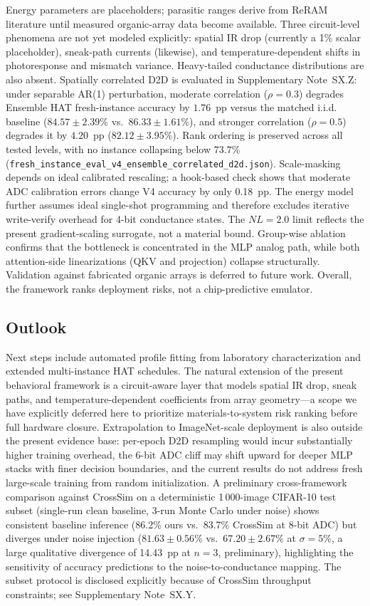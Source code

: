 Energy parameters are placeholders; parasitic ranges derive from ReRAM literature \citep{fastirdrop2025,iconniv2025} until measured organic-array data become available. Three circuit-level phenomena are not yet modeled explicitly: spatial IR drop (currently a 1\% scalar placeholder), sneak-path currents (likewise), and temperature-dependent shifts in photoresponse and mismatch variance. Heavy-tailed conductance distributions are also absent. Spatially correlated D2D is evaluated in Supplementary Note~SX.Z: under separable AR(1) perturbation, moderate correlation ($\rho=0.3$) degrades Ensemble HAT fresh-instance accuracy by $1.76$~pp versus the matched i.i.d. baseline ($84.57\pm2.39$\% vs.\ $86.33\pm1.61$\%), and stronger correlation ($\rho=0.5$) degrades it by $4.20$~pp ($82.12\pm3.95$\%). Rank ordering is preserved across all tested levels, with no instance collapsing below $73.7$\% (\texttt{fresh\_instance\_eval\_v4\_ensemble\_correlated\_d2d.json}). Scale-masking depends on ideal calibrated rescaling; a hook-based check shows that moderate ADC calibration errors change V4 accuracy by only 0.18~pp. The energy model further assumes ideal single-shot programming and therefore excludes iterative write-verify overhead for 4-bit conductance states. The $NL=2.0$ limit reflects the present gradient-scaling surrogate, not a material bound. Group-wise ablation confirms that the bottleneck is concentrated in the MLP analog path, while both attention-side linearizations (QKV and projection) collapse structurally. Validation against fabricated organic arrays is deferred to future work. Overall, the framework ranks deployment risks, not a chip-predictive emulator.

\subsection{Outlook}

Next steps include automated profile fitting from laboratory characterization and extended multi-instance HAT schedules. The natural extension of the present behavioral framework is a circuit-aware layer that models spatial IR drop, sneak paths, and temperature-dependent coefficients from array geometry---a scope we have explicitly deferred here to prioritize materials-to-system risk ranking before full hardware closure. Extrapolation to ImageNet-scale deployment is also outside the present evidence base: per-epoch D2D resampling would incur substantially higher training overhead, the 6-bit ADC cliff may shift upward for deeper MLP stacks with finer decision boundaries, and the current results do not address fresh large-scale training from random initialization. A preliminary cross-framework comparison against CrossSim on a deterministic 1\,000-image CIFAR-10 test subset (single-run clean baseline, 3-run Monte Carlo under noise) shows consistent baseline inference (86.2\% ours vs.\ 83.7\% CrossSim at 8-bit ADC) but diverges under noise injection ($81.63 \pm 0.56$\% vs.\ $67.20 \pm 2.67$\% at $\sigma=5\%$, a large qualitative divergence of 14.43~pp at $n=3$, preliminary), highlighting the sensitivity of accuracy predictions to the noise-to-conductance mapping. The subset protocol is disclosed explicitly because of CrossSim throughput constraints; see Supplementary Note~SX.Y.
